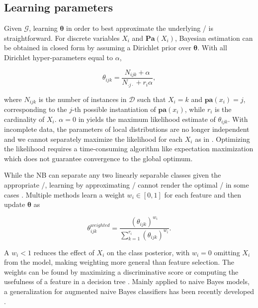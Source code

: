 \subsection{Learning parameters}\label{learning-parameters}

Given \(\mathcal{G}\), learning \(\boldsymbol{\theta}\) in order to best
approximate the underlying \PCX/ is straightforward. For discrete
variables \(X_i\) and \(\mathbf{Pa}(X_i)\), Bayesian estimation can be
obtained in closed form by assuming a Dirichlet prior over
\(\boldsymbol{\theta}\). With all Dirichlet hyper-parameters equal to
\(\alpha\),

\begin{equation}
\theta_{ijk} = \frac{N_{ijk} + \alpha}{N_{ \cdot j \cdot } + r_i \alpha},
\label{eq:disparams}
\end{equation}

where \(N_{ijk}\) is the number of instances in \(\mathcal{D}\) such
that \(X_i = k\) and \(\mathbf{pa}(x_i) = j\), corresponding to the
\(j\)-th possible instantiation of \(\mathbf{pa}(x_i)\), while \(r_i\)
is the cardinality of \(X_i\). \(\alpha = 0\) in  yields
the maximum likelihood estimate of \(\theta_{ijk}\). With incomplete
data, the parameters of local distributions are no longer independent
and we cannot separately maximize the likelihood for each \(X_i\) as in
. Optimizing the likelihood requires a time-consuming
algorithm like expectation maximization \citep{Dempster1977} which does
not guarantee convergence to the global optimum.

While the NB can separate any two linearly separable classes given the
appropriate \mthetas/, learning by approximating \PCX/ cannot render the
optimal \mthetas/ in some cases \citep{jaeger2003}. Multiple methods
\citep{Hall2007,Zaidi2013,Zaidi2017} learn a weight \(w_i \in [0,1]\)
for each feature and then update \(\boldsymbol{\theta}\) as

\begin{equation*}
  \theta_{ijk}^{weighted} = \frac{(\theta_{ijk})^{w_i}}{\sum_{k=1}^{r_i} (\theta_{ijk})^{w_i}}.
\end{equation*}

\noindent A \(w_i < 1\) reduces the effect of \(X_i\) on the class
posterior, with \(w_i = 0\) omitting \(X_i\) from the model, making
weighting more general than feature selection. The weights can be found
by maximizing a discriminative score \citep{Zaidi2013} or computing the
usefulness of a feature in a decision tree \citep{Hall2007}. Mainly
applied to naive Bayes models, a generalization for augmented naive
Bayes classifiers has been recently developed \citep{Zaidi2017}.


